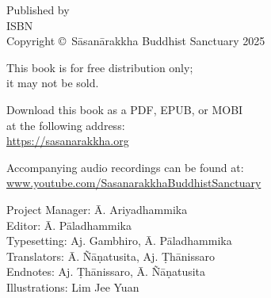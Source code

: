
\cleartoverso
\thispagestyle{empty}

{%

	\ifafiveversion \fontsize{10}{16}\selectfont \fi
	\ifninebythirteenversion \fontsize{7.5}{11}\selectfont \fi
	\centering
	\setlength{\parindent}{0pt}%

	\ifafiveversion \vspace{0.5cm} \fi
	\ifninebythirteenversion \vspace{0.15cm} \fi

	Published by \publisher\\

	ISBN \theISBN\\
	Copyright \copyright\ Sāsanārakkha Buddhist Sanctuary 2025

	\ifafiveversion \vspace{0.5cm} \fi
	\ifninebythirteenversion \vspace{0.25cm} \fi

	This book is for free distribution only;\\
	it may not be sold.

	\ifafiveversion \vspace{0.5cm} \fi
	\ifninebythirteenversion \vspace{0.25cm} \fi

	Download this book as a PDF, EPUB, or MOBI\\
	at the following address:\\
	\href{https://sasanarakkha.org/}{https://sasanarakkha.org}

	Accompanying audio recordings can be found at: 
	\href{www.youtube.com/SasanarakkhaBuddhistSanctuary}{www.youtube.com/SasanarakkhaBuddhistSanctuary}

	\ifafiveversion \vspace{0.5cm} \fi
	\ifninebythirteenversion \vspace{0.25cm} \fi

	Project Manager: Ā. Ariyadhammika\\
	Editor: Ā. Pāladhammika\\
	Typesetting: Aj. Gambhiro, Ā. Pāladhammika\\
	Translators: Ā. Ñāṇatusita, Aj. Ṭhānissaro\\
	Endnotes: Aj. Ṭhānissaro, Ā. Ñāṇatusita\\
	Illustrations: Lim Jee Yuan

	\ifafiveversion \vspace{0.5cm} \fi
	\ifninebythirteenversion \vspace{0.25cm} \fi

}
